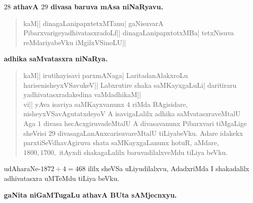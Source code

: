 \begin{center}
{\large\bf {\boldmath$28$} athavA {\boldmath$29$} divasa baruva mAsa niNaRyavu.}
\end{center}

\begin{verse}
kaM|| dinagaLanipapxtetxMTanu| gaNisuvarA PibarxvarigeyadhivatasxradoLf|| dinagaLanipapxtotxMBa| tetxNisuva reMdariyabeVku iMgilxVSinoLU||
\end{verse}

\begin{center}
{\large\bf adhika saMvatasxra niNaRya.}
\end{center}

\begin{verse}
kaM|| irutihayisavi parxmANaga| LaritadanAlakxroLu harisenisheyxVSavukeV|| Labxrutire shaka saMKayxgaLuLi| daritiraru yadhivatasxradakedina vaMdadhikaM||\\

vi|| yAva isaviya saMKayxvanunx $4$ riMda BAgisidare, nisheyxVSavAgutatxdeyoV A isavigaLalilx adhika saMvatasxraveMtalU Aga $1$ divasa hecAcxgiruvadeMtalU A divasavanunx Pibarxvari tiMgaLige sheVrisi $29$ divasagaLanAnxcarisuvareMtalU tiLiyabeVku. Adare idakekx parxtiSeVdhavAgiruva shata saMKayxgaLanunx hotuR, aMdare, $1800, 1700,$ itAyxdi shakagaLalilx baruvadilalxveMdu tiLiya beVku. 
\end{verse}

udAharaNe-$1872 \div 4=468$ ililx sheVSa uLiyudilalxvu, AdadxriMda I shakadalilx adhivatasxra uMTeMdu tiLiya beVku.

\begin{center}
{\large\bf gaNita niGaMTugaLu athavA BUta sAMjecnxyu.}
\end{center}

